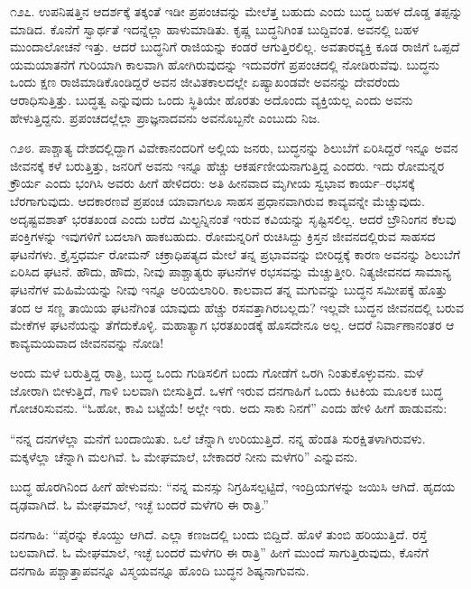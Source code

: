 ೧೨೭. ಉಪನಿಷತ್ತಿನ ಆದರ್ಶಕ್ಕೆ ತಕ್ಕಂತೆ ಇಡೀ ಪ್ರಪಂಚವನ್ನು ಮೇಲೆತ್ತ ಬಹುದು ಎಂದು ಬುದ್ಧ ಬಹಳ ದೊಡ್ಡ ತಪ್ಪನ್ನು ಮಾಡಿದ. ಕೊನೆಗೆ ಸ್ವಾರ್ಥತೆ ಇದನ್ನೆಲ್ಲಾ ಹಾಳುಮಾಡಿತು. ಕೃಷ್ಣ ಬುದ್ಧನಿಗಿಂತ ಬುದ್ದಿವಂತ. ಅವನಲ್ಲಿ ಬಹಳ ಮುಂದಾಲೋಚನೆ ಇತ್ತು. ಆದರೆ ಬುದ್ಧನಿಗೆ ರಾಜಿಯನ್ನು ಕಂಡರೆ ಆಗುತ್ತಿರಲಿಲ್ಲ. ಅವತಾರವ್ಯಕ್ತಿ ಕೂಡ ರಾಜಿಗೆ ಒಪ್ಪದೆ ಯಮಯಾತನೆಗೆ ಗುರಿಯಾಗಿ ಕಾಲವಾಗಿ ಹೋಗಿರುವುದನ್ನು ಇದುವರೆಗೆ ಪ್ರಪಂಚದಲ್ಲಿ ನೋಡಿರುವೆವು. ಬುದ್ಧನು ಒಂದು ಕ್ಷಣ ರಾಜಿಮಾಡಿಕೊಂಡಿದ್ದರೆ ಅವನ ಜೀವಿತಕಾಲದಲ್ಲೇ ಏಷ್ಯಾಖಂಡವೇ ಅವನನ್ನು ದೇವರೆಂದು ಆರಾಧಿಸುತ್ತಿತ್ತು. ಬುದ್ಧತ್ವ ಎನ್ನುವುದು ಒಂದು ಸ್ಥಿತಿಯೇ ಹೊರತು ಅದೊಂದು ವ್ಯಕ್ತಿಯಲ್ಲ ಎಂದು ಅವನು ಹೇಳುತ್ತಿದ್ದನು. ಪ್ರಪಂಚದಲ್ಲೆಲ್ಲಾ ಪ್ರಾಜ್ಞನಾದವನು ಅವನೊಬ್ಬನೇ ಎಂಬುದು ನಿಜ.

೧೨೮. ಪಾಶ್ಚಾತ್ಯ ದೇಶದಲ್ಲಿದ್ದಾಗ ವಿವೇಕಾನಂದರಿಗೆ ಅಲ್ಲಿಯ ಜನರು, ಬುದ್ಧನನ್ನು ಶಿಲುಬೆಗೆ ಏರಿಸಿದ್ದರೆ ಇನ್ನೂ ಅವನ ಜೀವನಕ್ಕೆ ಕಳೆ ಬರುತ್ತಿತ್ತು, ಜನರಿಗೆ ಅವನು ಇನ್ನೂ ಹೆಚ್ಚು ಆಕರ್ಷಣೀಯನಾಗುತ್ತಿದ್ದ ಎಂದರು. ಇದು ರೋಮನ್ನರ ಕ್ರೌರ್ಯ ಎಂದು ಭಂಗಿಸಿ ಅವರು ಹೀಗೆ ಹೇಳಿದರು: ಅತಿ ಹೀನವಾದ ಮೃಗೀಯ ಸ್ವಭಾವ ಕಾರ್ಯ–ರಭಸಕ್ಕೆ ಬೆರಗಾಗುವುದು. ಆದಕಾರಣವೆ ಪ್ರಪಂಚ ಯಾವಾಗಲೂ ಸಾಹಸ ಪ್ರಧಾನವಾಗಿರುವ ಕಾವ್ಯವನ್ನೇ ಮೆಚ್ಚುವುದು. ಅದೃಷ್ಟವಶಾತ್ ಭರತಖಂಡ  ಎಂದು ಬರೆದ ಮಿಲ್ಟನ್ನಿನಂತೆ ಇರುವ ಕವಿಯನ್ನು ಸೃಷ್ಟಿಸಲಿಲ್ಲ. ಆದರೆ ಬ್ರೌನಿಂಗನ ಕೆಲವು ಪಂಕ್ತಿಗಳನ್ನು ಇವುಗಳಿಗೆ ಬದಲಾಗಿ ಹಾಕಬಹುದು. ರೋಮನ್ನರಿಗೆ ರುಚಿಸಿದ್ದು ಕ್ರಿಸ್ತನ ಜೀವನದಲ್ಲಿರುವ ಸಾಹಸದ ಘಟನೆಗಳು. ಕ್ರೈಸ್ತಧರ್ಮ ರೋಮನ್ ಚಕ್ರಾಧಿಪತ್ಯದ ಮೇಲೆ ತನ್ನ ಪ್ರಭಾವವನ್ನು ಬೀರಿದ್ದಕ್ಕೆ ಕಾರಣ ಅವನನ್ನು ಶಿಲುಬೆಗೆ ಏರಿಸಿದ ಘಟನೆ. ಹೌದು, ಹೌದು, ನೀವು ಪಾಶ್ಚಾತ್ಯರು ಘಟನೆಗಳ ರಭಸವನ್ನು ಮೆಚ್ಚುತ್ತೀರಿ. ನಿತ್ಯಜೀವನದ ಸಾಮಾನ್ಯ ಘಟನೆಗಳ ಮಹಿಮೆಯನ್ನು ನೀವು ಇನ್ನೂ ಅರಿಯಲಾರಿರಿ. ಕಾಲವಾದ ತನ್ನ ಮಗುವನ್ನು ಬುದ್ಧನ ಸಮೀಪಕ್ಕೆ ಹೊತ್ತು ತಂದ ಆ ಸಣ್ಣ ತಾಯಿಯ ಘಟನೆಗಿಂತ ಯಾವುದು ಹೆಚ್ಚು ರಸವತ್ತಾಗಿರಬಲ್ಲದು? ಇಲ್ಲವೇ ಬುದ್ಧನ ಜೀವನದಲ್ಲಿ ಬರುವ ಮೇಕೆಗಳ ಘಟನೆಯನ್ನು ತೆಗೆದುಕೊಳ್ಳಿ. ಮಹಾತ್ಯಾಗ ಭರತಖಂಡಕ್ಕೆ ಹೊಸದೇನೂ ಅಲ್ಲ. ಆದರೆ ನಿರ್ವಾಣಾನಂತರ ಆ ಕಾವ್ಯಮಯವಾದ ಜೀವನವನ್ನು ನೋಡಿ!

ಅಂದು ಮಳೆ ಬರುತ್ತಿದ್ದ ರಾತ್ರಿ, ಬುದ್ಧ ಒಂದು ಗುಡಿಸಲಿಗೆ ಬಂದು ಗೋಡೆಗೆ ಒರಗಿ ನಿಂತುಕೊಳ್ಳುವನು. ಮಳೆ ಜೋರಾಗಿ ಬೀಳುತ್ತಿದೆ, ಗಾಳಿ ಬಲವಾಗಿ ಬೀಸುತ್ತಿದೆ. ಒಳಗೆ ಇರುವ ದನಗಾಹಿಗೆ ಒಂದು ಕಿಟಕಿಯ ಮೂಲಕ ಬುದ್ಧ ಗೋಚರಿಸುವನು. “ಓಹೋ, ಕಾವಿ ಬಟ್ಟೆಯೆ! ಅಲ್ಲೇ ಇರು. ಅದು ಸಾಕು ನಿನಗೆ” ಎಂದು ಹೇಳಿ ಹೀಗೆ ಹಾಡುವನು:

“ನನ್ನ ದನಗಳೆಲ್ಲಾ ಮನೆಗೆ ಬಂದಾಯಿತು. ಒಲೆ ಚೆನ್ನಾಗಿ ಉರಿಯುತ್ತಿದೆ. ನನ್ನ ಹೆಂಡತಿ ಸುರಕ್ಷಿತಳಾಗಿರುವಳು. ಮಕ್ಕಳೆಲ್ಲಾ ಚೆನ್ನಾಗಿ ಮಲಗಿವೆ. ಓ ಮೇಘಮಾಲೆ, ಬೇಕಾದರೆ ನೀನು ಮಳೆಗರಿ” ಎನ್ನುವನು.

ಬುದ್ಧ ಹೊರಗಿನಿಂದ ಹೀಗೆ ಹೇಳುವನು: “ನನ್ನ ಮನಸ್ಸು ನಿಗ್ರಹಿಸಲ್ಪಟ್ಟಿದೆ, ಇಂದ್ರಿಯಗಳನ್ನು ಜಯಿಸಿ ಆಗಿದೆ. ಹೃದಯ ದೃಢವಾಗಿದೆ. ಓ ಮೇಘಮಾಲೆ, ಇಚ್ಛೆ ಬಂದರೆ ಮಳೆಗರಿ ಈ ರಾತ್ರಿ.”

ದನಗಾಹಿ: “ಪೈರನ್ನು ಕೊಯ್ದು ಆಗಿದೆ. ಎಲ್ಲಾ ಕಣಜದಲ್ಲಿ ಬಂದು ಬಿದ್ದಿದೆ. ಹೊಳೆ ತುಂಬಿ ಹರಿಯುತ್ತಿದೆ. ರಸ್ತೆ ಬಲವಾಗಿದೆ. ಓ ಮೇಘಮಾಲೆ, ಇಚ್ಛೆ ಬಂದರೆ ಮಳೆಗರಿ ಈ ರಾತ್ರಿ” ಹೀಗೆ ಮುಂದೆ ಸಾಗುತ್ತಿರುವುದು, ಕೊನೆಗೆ ದನಗಾಹಿ ಪಶ್ಚಾತ್ತಾಪವನ್ನೂ ವಿಸ್ಮಯವನ್ನೂ ಹೊಂದಿ ಬುದ್ಧನ ಶಿಷ್ಯನಾಗುವನು.

